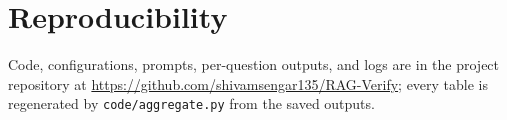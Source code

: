 \documentclass[conference]{IEEEtran}
\begin{document}
\section*{Reproducibility}
Code, configurations, prompts, per-question outputs, and logs are in the project repository at \url{https://github.com/shivamsengar135/RAG-Verify}; every table is regenerated by \texttt{code/aggregate.py} from the saved outputs.



\end{document}
